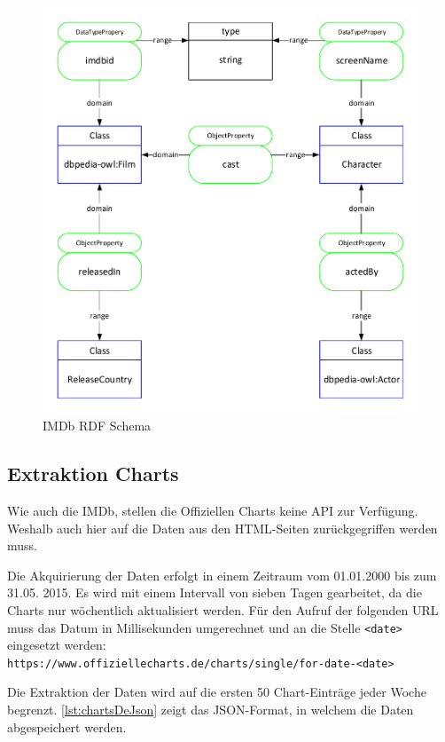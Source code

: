 \documentclass[parskip]{scrartcl}
\begin{document}
\begin{figure}[H]
    \centering
    \caption{IMDb RDF Schema}
    \label{fig:imdbrdf}
    \includegraphics[scale=0.8]{imdb}
\end{figure}

\subsection{Extraktion Charts}

Wie auch die IMDb, stellen die Offiziellen Charts keine API zur Verfügung. Weshalb auch hier auf die Daten aus den HTML-Seiten zurückgegriffen werden muss.

Die Akquirierung der Daten erfolgt in einem Zeitraum vom 01.01.2000 bis zum 31.05. 2015. Es wird mit einem Intervall von sieben Tagen gearbeitet, da die Charts nur wöchentlich aktualisiert werden. Für den Aufruf der folgenden URL muss das Datum in Millisekunden umgerechnet und an die Stelle \texttt{<date>} eingesetzt werden:\\
\texttt{https://www.offiziellecharts.de/charts/single/for-date-<date>}

Die Extraktion der Daten wird auf die ersten 50 Chart-Einträge jeder Woche begrenzt. \autoref{lst:chartsDeJson} zeigt das JSON-Format, in welchem die Daten abgespeichert werden.
\end{document}

